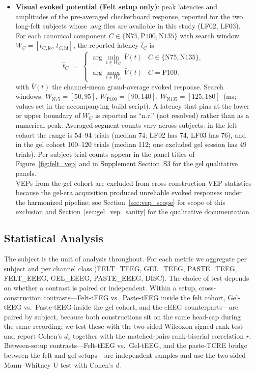 \documentclass[10pt,a4paper]{article}
\begin{document}
\begin{itemize}
\item \textbf{Visual evoked potential (Felt setup only)}: peak latencies and amplitudes of the pre-averaged checkerboard response, reported for the two long-felt subjects whose .avg files are available in this study (LF02, LF03). For each canonical component $C\in\{\mathrm{N75},\mathrm{P100},\mathrm{N135}\}$ with search window $W_{C}=[t_{C,\mathrm{lo}},\,t_{C,\mathrm{hi}}]$, the reported latency $\hat{t}_{C}$ is
  \begin{equation}
  \hat{t}_{C}
  \;=\;
  \begin{cases}
  \arg\min_{t\in W_{C}}\,\bar{V}(t) & C\in\{\mathrm{N75},\mathrm{N135}\},\\[2pt]
  \arg\max_{t\in W_{C}}\,\bar{V}(t) & C=\mathrm{P100},
  \end{cases}
  \label{eq:peak}
  \end{equation}
  with $\bar{V}(t)$ the channel-mean grand-average evoked response. Search windows: $W_{\mathrm{N75}}=[50,95]$, $W_{\mathrm{P100}}=[90,140]$, $W_{\mathrm{N135}}=[125,180]$~(ms; values set in the accompanying build script). A latency that pins at the lower or upper boundary of $W_{C}$ is reported as ``n.r.'' (not resolved) rather than as a numerical peak. Averaged-segment counts vary across subjects: in the felt cohort the range is 54--94 trials (median 74; LF02 has 74, LF03 has 76), and in the gel cohort 100--120 trials (median 112; one excluded gel session has 49 trials). Per-subject trial counts appear in the panel titles of Figure~\ref{fig:felt_vep} and in Supplement Section~S3 for the gel qualitative panels.\\
  VEPs from the gel cohort are excluded from cross-construction VEP statistics because the gel-era acquisition produced unreliable evoked responses under the harmonized pipeline; see Section~\ref{sec:vep_scope} for scope of this exclusion and Section~\ref{sec:gel_vep_sanity} for the qualitative documentation.
\end{itemize}

\subsection{Statistical Analysis}

The subject is the unit of analysis throughout. For each metric we aggregate per subject and per channel class (FELT\_TEEG, GEL\_TEEG, PASTE\_TEEG, FELT\_EEEG, GEL\_EEEG, PASTE\_EEEG, DISC). The choice of test depends on whether a contrast is paired or independent. Within a setup, cross-construction contrasts---Felt-tEEG vs.\ Paste-tEEG inside the felt cohort, Gel-tEEG vs.\ Paste-tEEG inside the gel cohort, and the eEEG counterparts---are paired by subject, because both constructions sit on the same head-cap during the same recording; we test these with the two-sided Wilcoxon signed-rank test and report Cohen's $d_z$ together with the matched-pairs rank-biserial correlation $r$. Between-setup contrasts---Felt-tEEG vs.\ Gel-tEEG, and the paste-TCRE bridge between the felt and gel setups---are independent samples and use the two-sided Mann--Whitney U test with Cohen's $d$.
\end{document}
